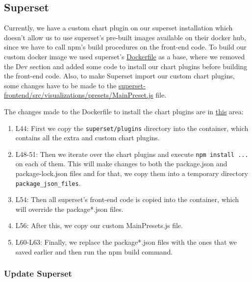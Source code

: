 \documentclass[
]{book}
\providecommand{\tightlist}{%
  \setlength{\itemsep}{0pt}\setlength{\parskip}{0pt}}
\begin{document}
\hypertarget{superset}{%
\subsection*{Superset}\label{superset}}

Currently, we have a custom chart plugin on our superset installation which doesn't allow us to use superset's pre-built images available on their docker hub, since we have to call npm's build procedures on the front-end code.
To build our custom docker image we used superset's \href{https://github.com/apache/superset/blob/1.0.1/Dockerfile}{Dockerfile} as a base, where we removed the Dev section and added some code to install our chart plugins before building the front-end code.
Also, to make Superset import our custom chart plugins, some changes have to be made to the \href{https://github.com/apache/superset/blob/1.0.1/superset-frontend/src/visualizations/presets/MainPreset.js}{superset-frontend/src/visualizations/presets/MainPreset.js} file.

The changes made to the Dockerfile to install the chart plugins are in \href{https://github.com/EHDEN/NetworkDashboards/blob/master/docker/superset/Dockerfile\#L44-L63}{this} area:

\begin{enumerate}
\def\labelenumi{\arabic{enumi}.}
\tightlist
\item
  L44: First we copy the \texttt{superset/plugins} directory into the container, which contains all the extra and custom chart plugins.
\item
  L48-51: Then we iterate over the chart plugins and execute \texttt{npm\ install\ ...} on each of them.
  This will make changes to both the package.json and package-lock.json files and for that, we copy them into a temporary directory \texttt{package\_json\_files}.
\item
  L54: Then all superset's front-end code is copied into the container, which will override the package*.json files.
\item
  L56: After this, we copy our custom MainPresets.js file.
\item
  L60-L63: Finally, we replace the package*.json files with the ones that we saved earlier and then run the npm build command.
\end{enumerate}

\hypertarget{update-superset}{%
\subsubsection*{Update Superset}\label{update-superset}}
\end{document}
